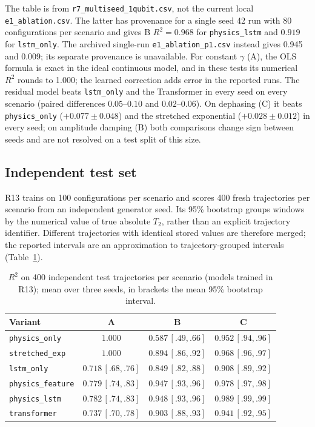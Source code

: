 \documentclass[twocolumn,10pt]{article}
\begin{document}
The table is from \texttt{r7\_multiseed\_1qubit.csv}, not the current
local \texttt{e1\_ablation.csv}. The latter has provenance for a single
seed 42 run with 80 configurations per scenario and gives B $R^2=0.968$
for \texttt{physics\_lstm} and $0.919$ for \texttt{lstm\_only}. The
archived single-run \texttt{e1\_ablation\_p1.csv} instead gives 0.945
and 0.009; its separate provenance is unavailable. For constant $\gamma$
(A), the OLS formula is exact in the ideal continuous model, and in these
tests its numerical $R^2$ rounds to 1.000; the learned correction adds
error in the reported runs.
The residual model beats \texttt{lstm\_only} and the Transformer in every
seed on every scenario (paired differences $0.05$--$0.10$ and
$0.02$--$0.06$).
On dephasing (C) it beats \texttt{physics\_only} ($+0.077 \pm 0.048$)
and the stretched exponential ($+0.028 \pm 0.012$) in every seed; on
amplitude damping (B) both comparisons change sign between seeds and are
not resolved on a test split of this size.

\subsection{Independent test set}
\label{sec:r13}

R13 trains on 100 configurations per scenario and scores 400 fresh
trajectories per scenario from an independent generator seed. Its 95\%
bootstrap groups windows by the numerical value of true absolute $T_2$,
rather than an explicit trajectory identifier. Different trajectories with
identical stored values are therefore merged; the reported intervals are an
approximation to trajectory-grouped intervals (Table~\ref{tab:r13}).

\begin{table}[h]
\centering
\caption{$R^2$ on 400 independent test trajectories per scenario (models
  trained in R13); mean over three seeds, in brackets the mean 95\%
  bootstrap interval.\label{tab:r13}}
\footnotesize
\setlength{\tabcolsep}{2.5pt}
\begin{tabular}{lccc}
\toprule
Variant & A & B & C \\
\midrule
\texttt{physics\_only}    & $1.000$ & $0.587\,[.49,.66]$ & $0.952\,[.94,.96]$ \\
\texttt{stretched\_exp}   & $1.000$ & $0.894\,[.86,.92]$ & $0.968\,[.96,.97]$ \\
\texttt{lstm\_only}       & $0.718\,[.68,.76]$ & $0.849\,[.82,.88]$ & $0.908\,[.89,.92]$ \\
\texttt{physics\_feature} & $0.779\,[.74,.83]$ & $0.947\,[.93,.96]$ & $0.978\,[.97,.98]$ \\
\texttt{physics\_lstm}    & $0.782\,[.74,.83]$ & $\mathbf{0.948\,[.93,.96]}$ & $\mathbf{0.989\,[.99,.99]}$ \\
\texttt{transformer}      & $0.737\,[.70,.78]$ & $0.903\,[.88,.93]$ & $0.941\,[.92,.95]$ \\
\bottomrule
\end{tabular}
\end{table}
\end{document}
